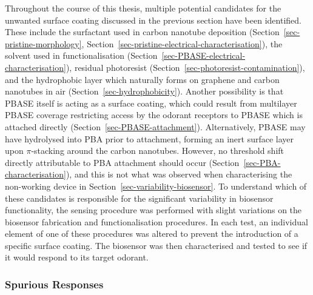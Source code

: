 \documentclass[
  a4paper,
]{scrbook}
\begin{document}
Throughout the course of this thesis, multiple potential candidates for
the unwanted surface coating discussed in the previous section have been
identified. These include the surfactant used in carbon nanotube
deposition (Section~\ref{sec-pristine-morphology},
Section~\ref{sec-pristine-electrical-characterisation}), the solvent
used in functionalisation
(Section~\ref{sec-PBASE-electrical-characterisation}), residual
photoresist (Section~\ref{sec-photoresist-contamination}), and the
hydrophobic layer which naturally forms on graphene and carbon nanotubes
in air (Section~\ref{sec-hydrophobicity}). Another possibility is that
PBASE itself is acting as a surface coating, which could result from
multilayer PBASE coverage restricting access by the odorant receptors to
PBASE which is attached directly (Section~\ref{sec-PBASE-attachment}).
Alternatively, PBASE may have hydrolysed into PBA prior to attachment,
forming an inert surface layer upon \(\pi\)-stacking around the carbon
nanotubes. However, no threshold shift directly attributable to PBA
attachment should occur (Section~\ref{sec-PBA-characterisation}), and
this is not what was observed when characterising the non-working device
in Section~\ref{sec-variability-biosensor}. To understand which of these
candidates is responsible for the significant variability in biosensor
functionality, the sensing procedure was performed with slight
variations on the biosensor fabrication and functionalisation
procedures. In each test, an individual element of one of these
procedures was altered to prevent the introduction of a specific surface
coating. The biosensor was then characterised and tested to see if it
would respond to its target odorant.

\hypertarget{spurious-responses}{%
\subsubsection*{Spurious Responses}\label{spurious-responses}}
\end{document}
